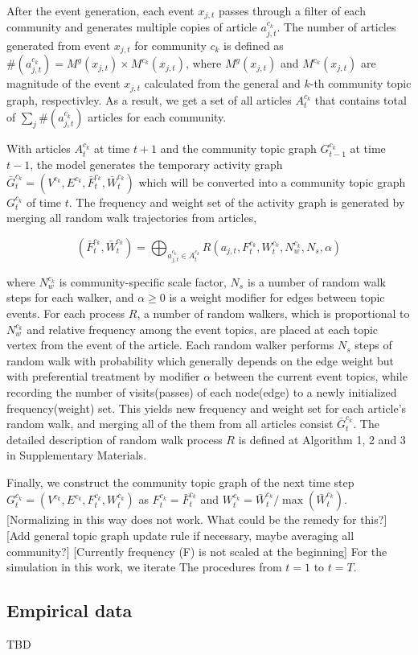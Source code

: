 \documentclass{nature}
\begin{document}
\begin{methods}
After the event generation, each event $x_{j, t}$ passes through a filter of each community and generates multiple copies of article $a_{j, t}^{c_k}$. The number of articles generated from event $x_{j, t}$ for community $c_k$ is defined as $\#(a_{j, t}^{c_k}) = M^g(x_{j, t}) \times M^{c_k}(x_{j, t})$, where $M^g(x_{j, t})$ and $M^{c_k}(x_{j, t})$ are magnitude of the event $x_{j, t}$ calculated from the general and $k$-th community topic graph, respectivley. As a result, we get a set of all articles $A_{t}^{c_k}$ that contains total of  $\sum_j \#(a_{j, t}^{c_k})$ articles for each community.

With articles $A_{t}^{c_k}$ at time $t+1$ and the community topic graph $G^{c_k}_{t-1}$ at time $t-1$, the model generates the temporary activity graph $\bar{G}_{t}^{c_k} = (V^{c_k}, E^{c_k}, \bar{F}_{t}^{c_k}, \bar{W}_{t}^{c_k})$ which will be converted into a community topic graph $G_{t}^{c_k}$ of time $t$. The frequency and weight set of the activity graph is generated by merging all random walk trajectories from articles, 

\begin{equation}
  (\bar{F}_{t}^{c_k}, \bar{W}_{t}^{c_k})=  \bigoplus_{a_{j, t}^{c_k} \in A_{t}^{c_k}} R(a_{j, t}, F_t^{c_k}, W_t^{c_k}, N_w^{c_k}, N_s, \alpha)
\end{equation}

 where $N_w^{c_k}$ is community-specific scale factor, $N_s$ is a number of random walk steps for each walker, and $\alpha \geq 0$ is a weight modifier for edges between topic events. For each process $R$, a number of random walkers, which is proportional to $N_w^{c_k}$ and relative frequency among the event topics, are placed at each topic vertex from the event of the article. Each random walker performs $N_s$ steps of random walk with probability which generally depends on the edge weight but with preferential treatment by modifier $\alpha$ between the current event topics, while recording the number of visits(passes) of each node(edge) to a newly initialized frequency(weight) set. This yields new frequency and weight set for each article's random walk, and merging all of the them from all articles consist $\bar{G}_{t}^{c_k}$. The detailed description of random walk process $R$ is defined at Algorithm 1, 2 and 3 in Supplementary Materials.

Finally, we construct the community topic graph of the next time step $G^{c_k}_{t} = (V^{c_k}, E^{c_k}, F_{t}^{c_k}, \allowbreak W_{t}^{c_k})$ as $F_{t}^{c_k} = \bar{F}_{t}^{c_k}$ and $W_{t}^{c_k} = \bar{W}_{t}^{c_k} / \max(\bar{W}_{t}^{c_k})$. [Normalizing in this way does not work. What could be the remedy for this?] [Add general topic graph update rule if necessary, maybe averaging all community?] [Currently frequency (F) is not scaled at the beginning] For the simulation in this work, we iterate The procedures from $t=1$ to $t=T$.

\subsection{Empirical data}
TBD


\end{methods}
\end{document}
